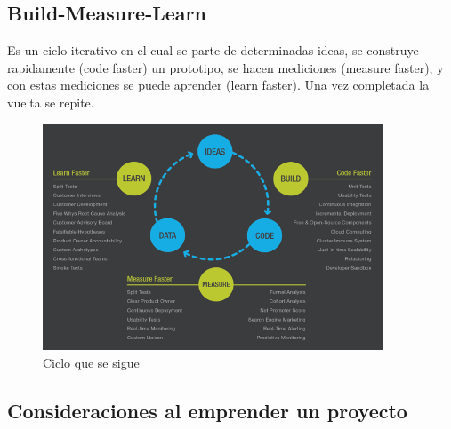\documentclass[titlepage,a4paper]{article}
\begin{document}
\newpage

\subsection{Build-Measure-Learn}
Es un ciclo iterativo en el cual se parte de determinadas ideas, se construye rapidamente (code faster) un prototipo, se hacen mediciones (measure faster), y con estas mediciones se puede aprender (learn faster). Una vez completada la vuelta se repite.

\begin{figure}[!htb]
    \centering
    \includegraphics[width=0.9\textwidth]{Imagenes/Build-Measure-Learn.png}
    \caption{Ciclo que se sigue}
\end{figure}

\subsection*{Consideraciones al emprender un proyecto}
\end{document}
